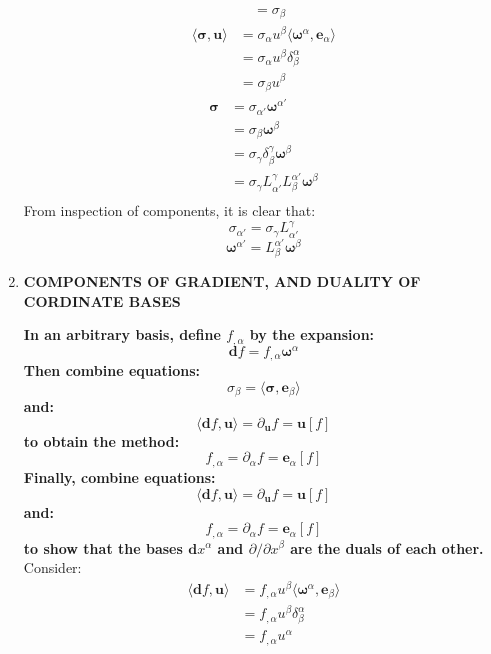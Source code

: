 \documentclass[9pt]{report}
\begin{document}
\begin{enumerate}
\[\begin{align}
      &= \sigma_\beta
    \end{align}
  \]
  \[
  \]
  \[
    \begin{align}
      \langle \boldsymbol{\sigma}, \boldsymbol{u} \rangle &= \sigma_\alpha u^\beta \langle \boldsymbol{\omega}^\alpha, \boldsymbol{e}_\alpha \rangle\\
                                                          &= \sigma_\alpha u^\beta \delta^\alpha_\beta \\
                                                          &= \sigma_\beta u^\beta
    \end{align}
  \]
  \[
    \begin{align}
    \boldsymbol{\sigma} &= \sigma_{\alpha'}\boldsymbol{\omega}^{\alpha'}\\
                        &= \sigma_\beta \boldsymbol{\omega}^\beta \\
                        &= \sigma_\gamma \delta^\gamma_\beta \boldsymbol{\omega}^\beta \\
                        &= \sigma_\gamma L^\gamma_{\alpha'} L^{\alpha'}_\beta \boldsymbol{\omega}^\beta \\
    \end{align}
  \]
  From inspection of components, it is clear that:
  \[
    \sigma_{\alpha'} = \sigma_\gamma L^\gamma_{\alpha'}
  \]
  \[
    \boldsymbol{\omega}^{\alpha'} = L^{\alpha'}_\beta \boldsymbol{\omega}^\beta
  \]
\item \textbf{COMPONENTS OF GRADIENT, AND DUALITY OF CORDINATE BASES}

  \textbf{In an arbitrary basis, define $f_{,\alpha}$ by the expansion:}
  \[
    \boldsymbol{d}f = f_{,\alpha} \boldsymbol{\omega}^\alpha
  \]
  \textbf{Then combine equations:}
  \[
    \sigma_\beta = \langle \boldsymbol{\sigma}, \boldsymbol{e}_\beta \rangle
  \]
  \textbf{and:}
  \[
    \langle \boldsymbol{d} f, \boldsymbol{u} \rangle = \partial_{\boldsymbol{u}} f = \boldsymbol{u}[f]
  \]
  \textbf{to obtain the method:}
  \[
    f_{,\alpha} = \partial_{\alpha} f = \boldsymbol{e}_\alpha [f]
  \]
  \textbf{Finally, combine equations:}
  \[
    \langle \boldsymbol{d} f, \boldsymbol{u} \rangle = \partial_{\boldsymbol{u}} f = \boldsymbol{u}[f]
  \]
  \textbf{and:}
  \[
    f_{,\alpha} = \partial_{\alpha} f = \boldsymbol{e}_\alpha [f]
  \]
  \textbf{to show that the bases $\boldsymbol{d}x^\alpha$ and $\partial / \partial x^\beta$ are the duals of each other.}
  Consider:
  \[
    \begin{align}
      \langle \boldsymbol{d}f, \boldsymbol{u} \rangle &= f_{,\alpha} u^\beta \langle \boldsymbol{\omega}^\alpha, \boldsymbol{e}_\beta \rangle \\
                                                      &= f_{,\alpha} u^\beta \delta^\alpha_\beta \\
                                                      &= f_{,\alpha} u^\alpha
    \end{align}
  \]
\end{enumerate}
\end{document}
